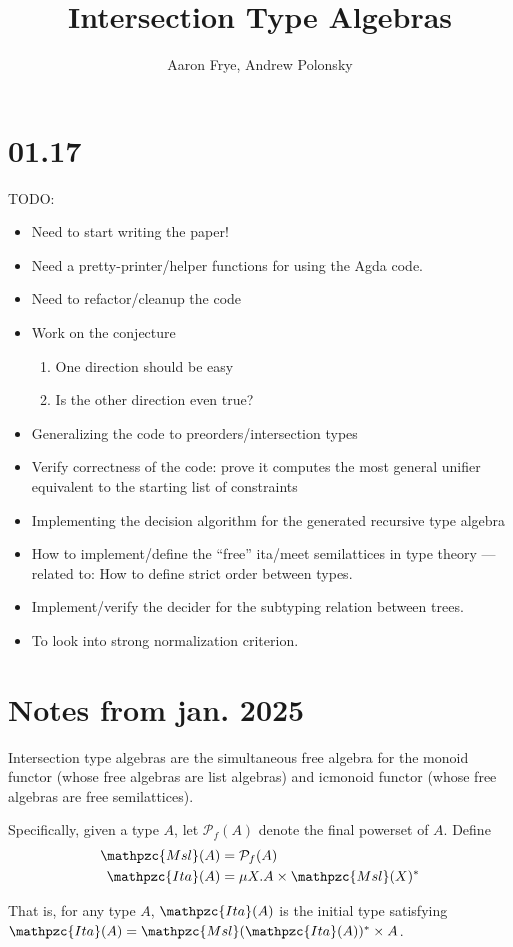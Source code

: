 \documentclass{scrartcl}
\title{Intersection Type Algebras}
\author{Aaron Frye, Andrew Polonsky}
\newcommand{\ita}{\mathpzc{Ita}}
\newcommand{\msl}{\mathpzc{Msl}}
\begin{document}
\section*{01.17}
TODO:
\begin{itemize}
  \item Need to start writing the paper!
  \item Need a pretty-printer/helper functions for using the Agda code.
  \item Need to refactor/cleanup the code
  \item Work on the conjecture
  \begin{enumerate}
    \item One direction should be easy
    \item Is the other direction even true?
  \end{enumerate}
  \item Generalizing the code to preorders/intersection types
  \item Verify correctness of the code: prove it computes the most general unifier
  equivalent to the starting list of constraints
  \item Implementing the decision algorithm for the generated recursive type algebra
  \item How to implement/define the ``free'' ita/meet semilattices in type theory
  --- related to: How to define strict order between types.
  \item Implement/verify the decider for the subtyping relation between trees.
  \item To look into strong normalization criterion.
\end{itemize}

\section{Notes from jan. 2025}
Intersection type algebras are the simultaneous free algebra for the
monoid functor (whose free algebras are list algebras) and
icmonoid functor (whose free algebras are free semilattices).

Specifically, given a type $A$, let $\mathcal{P}_f(A)$ denote the final
powerset of $A$.  Define
\begin{align}
  \label{e:msl}
  \msl(A) &= \mathcal{P}_f(A) \\
  \label{e:ita}
  \ita(A) &= \mu X. A \times \msl(X)^*
\end{align}

That is, for any type $A$, $\ita(A)$ is the initial type satisfying
$\ita(A) = \msl(\ita(A))^* \times A$.
\end{document}
